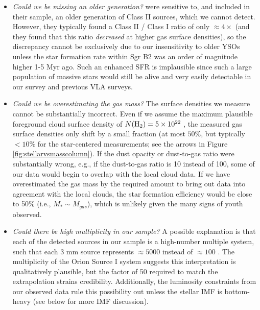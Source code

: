 \documentclass[twocolumn]{aastex61}
\begin{document}
\begin{itemize}
    \item \emph{Could we be missing an older generation?}
        \citet{Gutermuth2011a} were sensitive to, and included in their sample,
        an older generation of Class II sources, which we cannot detect.
        However, they typically found a Class II / Class I ratio of only
        $\approx4\times$ \citep{Gutermuth2009a} (and they found that this
        ratio \emph{decreased} at higher gas surface densities), so the
        discrepancy cannot be exclusively due to our insensitivity to older
        YSOs unless the star formation rate within Sgr B2 was an order of
        magnitude higher 1-5 Myr ago.  Such an enhanced SFR is implausible
        since such a large population of massive stars would still be alive and
        very easily detectable in our survey and previous VLA surveys. 

    \item \emph{Could we be overestimating the gas mass?}
        The surface densities we measure cannot be substantially incorrect.
        Even if we assume the maximum plausible foreground cloud surface
        density of $N(\textrm{H}_{2})=5\times10^{22}$ \persc, the measured gas surface densities
        only shift by a small fraction (at most $50\%$, but typically $<10\%$
        for the star-centered measurements; see the arrows in Figure
        \ref{fig:stellarvsmasscolumn}).
        If the dust opacity or dust-to-gas ratio were substantially wrong,
        e.g., if the dust-to-gas ratio is 10 instead of 100, some of
        our data would begin to overlap with the local cloud data.
        If we have overestimated the gas mass by the required amount to
        bring out data into agreement with the local clouds, the star
        formation efficiency would be close to 50\% (i.e., $M_*\sim M_{gas}$),
        which is unlikely given the many signs of youth observed.

    \item \emph{Could there be high multiplicity in our sample?} 
        A possible explanation is that each of the detected sources in our
        sample is a high-number multiple system, such that each 3 mm source
        represents $\approx5000$ \msun instead of $\approx100$ \msun.  The
        multiplicity of the Orion Source I system suggests this interpretation
        is qualitatively plausible, but the factor of 50 required to match the
        \citet{Gutermuth2011a} extrapolation strains credibility.
        Additionally, the luminosity constraints from our observed data
        rule this possibility out unless the stellar IMF is bottom-heavy
        (see below for more IMF discussion).


\end{itemize}
\end{document}
